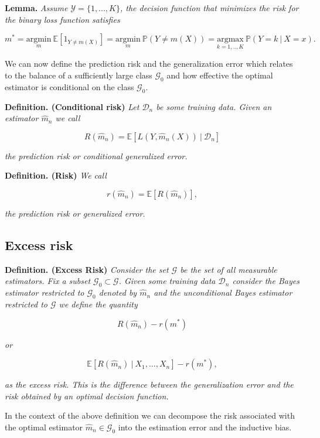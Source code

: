 \documentclass[a4paper,12pt,openany]{book}
\begin{document}
\textbf{Lemma.} \emph{Assume \(\mathcal{Y}=\{1,...,K\}\), the decision function that minimizes the risk for the binary loss function satisfies}

\[
m^*=\underset{m}{\text{argmin}}\ \mathbb{E}[1_{Y\ne m(X)}]=\underset{m}{\text{argmin}}\  \mathbb{P}(Y\ne m(X))=\underset{k=1,..,K}{\text{argmax}}\ \mathbb{P}(Y=k\ \vert\ X=x).
\]

We can now define the prediction risk and the generalization error which relates to the balance of a sufficiently large class \(\mathcal{G}_0\) and how effective the optimal estimator is conditional on the class \(\mathcal{G}_0\).

\textbf{Definition. (Conditional risk)} \emph{Let \(\mathcal{D}_n\) be some training data. Given an estimator \(\hat{m}_n\) we call}

\[
R(\hat{m}_n)=\mathbb{E}[L(Y,\hat{m}_n(X))\ \vert\ \mathcal{D}_n]
\]

\emph{the prediction risk or conditional generalized error.}

\textbf{Definition. (Risk)} \emph{We call}

\[
r(\hat{m}_n)=\mathbb{E}[R(\hat{m}_n)],
\]

\emph{the prediction risk or generalized error.}

\hypertarget{excess-risk}{%
\subsection{Excess risk}\label{excess-risk}}

\textbf{Definition. (Excess Risk)} \emph{Consider the set \(\mathcal{G}\) be the set of all measurable estimators. Fix a subset \(\mathcal{G}_0\subset\mathcal{G}\). Given some training data \(\mathcal{D}_n\) consider the Bayes estimator restricted to \(\mathcal{G}_0\) denoted by \(\hat{m}_n\) and the unconditional Bayes estimator restricted to \(\mathcal{G}\) we define the quantity}

\[
R(\hat{m}_n)-r(m^*)
\]

\emph{or}

\[
\mathbb{E}[R(\hat{m}_n)\ \vert\ X_1,...,X_n]-r(m^*),
\]

\emph{as the excess risk. This is the difference between the generalization error and the risk obtained by an optimal decision function.}

In the context of the above definition we can decompose the risk associated with the optimal estimator \(\hat{m}_n\in\mathcal{G}_0\) into the estimation error and the inductive bias.
\end{document}
